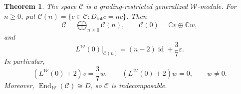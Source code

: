 \documentclass[11pt]{amsart}
\numberwithin{equation}{section}
\newtheorem{theorem}{Theorem}[section]
\theoremstyle{definition}
\theoremstyle{remark}
\newcommand{\CC}{\mathbb C}
\newcommand{\End}{\operatorname{End}}
\newcommand{\id}{\operatorname{id}}
\begin{document}
\begin{theorem}\label{thm:log}
The space $\mathcal C$ is a grading-restricted generalized $\mathcal W$-module.
For $n\geq0$, put $\mathcal C(n)=\{c\in\mathcal C:D_{\mathrm{tot}}c=nc\}$.
Then
\[
 \mathcal C=\bigoplus_{n\geq0}\mathcal C(n),\qquad
 \mathcal C(0)=\CC v\oplus\CC w,
\]
and
\begin{equation}\label{eq:C-L0}
 L^{\mathcal W}(0)|_{\mathcal C(n)}
 =(n-2)\id+\frac37\varepsilon.
\end{equation}
In particular,
\begin{equation}\label{eq:Jordan}
 (L^{\mathcal W}(0)+2)v=\frac37w,
 \qquad (L^{\mathcal W}(0)+2)w=0,
 \qquad w\neq0.
\end{equation}
Moreover, $\End_{\mathcal W}(\mathcal C)\cong D$, so $\mathcal C$
is indecomposable.
\end{theorem}
\end{document}
